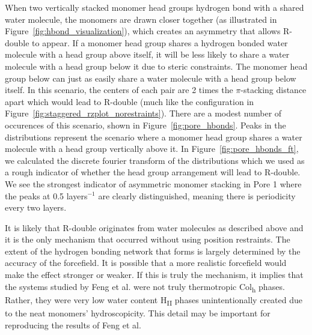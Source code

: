 \documentclass[journal=jpcbfk,manusciprt=article]{achemso}
\begin{document}
  When two vertically stacked monomer head groups hydrogen bond with a shared water 
  molecule, the monomers are drawn closer together (as illustrated in 
  Figure~\ref{fig:hbond_visualization}), which creates an asymmetry that allows 
  R-double to appear. If a monomer head group shares a hydrogen bonded water molecule
  with a head group above itself, it will be less likely to share a water molecule 
  with a head group below it due to steric constraints. The monomer head group below
  can just as easily share a water molecule with a head group below itself. In this scenario,
  the centers of each pair are 2 times the $\pi$-stacking distance apart which would
  lead to R-double (much like the configuration in Figure~\ref{fig:staggered_rzplot_norestraints}). There are
  a modest number of occurences of this scenario, shown in Figure~\ref{fig:pore_hbonds}. 
  Peaks in the distributions represent the scenario where a monomer head group shares a 
  water molecule with a head group vertically above it. In Figure~\ref{fig:pore_hbonds_ft},
  we calculated the discrete fourier transform of the distributions which we used as a rough 
  indicator of whether the head group arrangement will lead to R-double. We see the 
  strongest indicator of asymmetric monomer stacking in Pore 1 where the peaks at 0.5
  layers$^{-1}$ are clearly distinguished, meaning there is periodicity every two layers.
  
  It is likely that R-double originates from water molecules as described above and it is the 
  only mechanism that occurred without using position restraints. The extent of the hydrogen
  bonding network that forms is largely determined by the accuracy of the forcefield. It is 
  possible that a more realistic forcefield would make the effect stronger or weaker. If 
  this is truly the mechanism, it implies that the systems studied by Feng et 
  al.\cite{feng_scalable_2014,feng_thin_2016} were not truly thermotropic Col\textsubscript{h}
  phases. Rather, they were very low water content H\textsubscript{II} phases unintentionally
  created due to the neat monomers' hydroscopicity. This detail may be important for reproducing
  the results of Feng et al.
\end{document}
